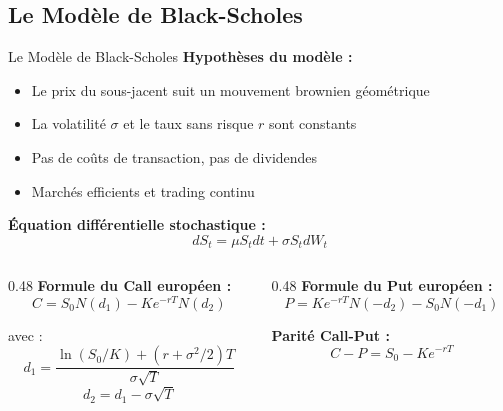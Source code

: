 \documentclass[aspectratio=169, 10pt]{beamer}
\begin{document}
\subsection{Le Modèle de Black-Scholes}

\begin{frame}{Le Modèle de Black-Scholes}
    \textbf{Hypothèses du modèle :}
    \begin{itemize}
        \item Le prix du sous-jacent suit un mouvement brownien géométrique
        \item La volatilité $\sigma$ et le taux sans risque $r$ sont constants
        \item Pas de coûts de transaction, pas de dividendes
        \item Marchés efficients et trading continu
    \end{itemize}
    
    \vspace{0.3cm}
    \textbf{Équation différentielle stochastique :}
    $$dS_t = \mu S_t dt + \sigma S_t dW_t$$
    
    \vspace{0.3cm}
    \begin{columns}[T]
        \begin{column}{0.48\textwidth}
            \textbf{Formule du Call européen :}
            $$C = S_0 N(d_1) - K e^{-rT} N(d_2)$$
            
            avec :
            $$d_1 = \frac{\ln(S_0/K) + (r + \sigma^2/2)T}{\sigma\sqrt{T}}$$
            $$d_2 = d_1 - \sigma\sqrt{T}$$
        \end{column}
        \begin{column}{0.48\textwidth}
            \textbf{Formule du Put européen :}
            $$P = K e^{-rT} N(-d_2) - S_0 N(-d_1)$$
            
            \vspace{0.3cm}
            \textbf{Parité Call-Put :}
            $$C - P = S_0 - K e^{-rT}$$
        \end{column}
    \end{columns}
\end{frame}
\end{document}
